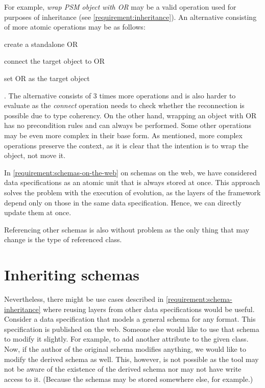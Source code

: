For example, \textit{wrap PSM object with OR} may be a valid operation used for purposes of inheritance (see \autoref{requirement:inheritance}). An alternative consisting of more atomic operations may be as follows:
\begin{enumerate*}[label={(\arabic*)}]
    \item create a standalone OR
    \item connect the target object to OR
    \item set OR as the target object
\end{enumerate*}. The alternative consists of 3 times more operations and is also harder to evaluate as the \textit{connect} operation needs to check whether the reconnection is possible due to type coherency. On the other hand, wrapping an object with OR has no precondition rules and can always be performed. Some other operations may be even more complex in their base form. As mentioned, more complex operations preserve the context, as it is clear that the intention is to wrap the object, not move it.

\medskip

In \autoref{requirement:schemas-on-the-web} on schemas on the web, we have considered data specifications as an atomic unit that is always stored at once. This approach solves the problem with the execution of evolution, as the layers of the framework depend only on those in the same data specification. Hence, we can directly update them at once.

Referencing other schemas is also without problem as the only thing that may change is the type of referenced class.

\section{Inheriting schemas}\label{section:inheriting-schemas}

Nevertheless, there might be use cases described in \autoref{requirement:schema-inheritance} where reusing layers from other data specifications would be useful. Consider a data specification that models a general schema for any format. This specification is published on the web. Someone else would like to use that schema to modify it slightly. For example, to add another attribute to the given class. Now, if the author of the original schema modifies anything, we would like to modify the derived schema as well. This, however, is not possible as the tool may not be aware of the existence of the derived schema nor may not have write access to it. (Because the schemas may be stored somewhere else, for example.)

